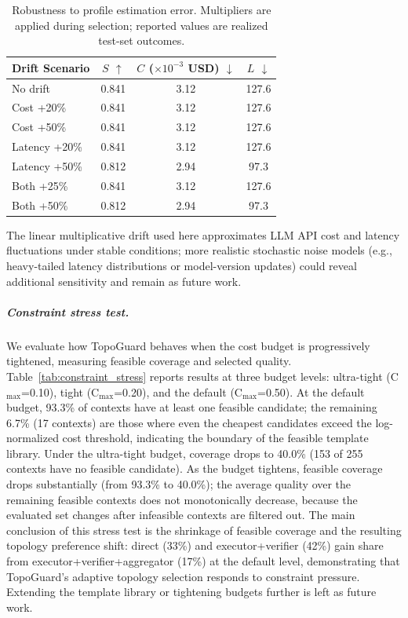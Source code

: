 \documentclass[manuscript,review,anonymous]{acmart}
\begin{document}
\begin{table}[t]
\centering
\caption{Robustness to profile estimation error. Multipliers are applied during selection; reported values are realized test-set outcomes.}
\label{tab:drift_results}
\small
\begin{tabular}{lccc}
\toprule
\textbf{Drift Scenario} & \textbf{$S$ $\uparrow$} & \textbf{$C$ ($\times 10^{-3}$ USD) $\downarrow$} & \textbf{$L$ $\downarrow$} \\
\midrule
No drift         & 0.841 & 3.12 & 127.6 \\
Cost +20\%       & 0.841 & 3.12 & 127.6 \\
Cost +50\%       & 0.841 & 3.12 & 127.6 \\
Latency +20\%    & 0.841 & 3.12 & 127.6 \\
Latency +50\%    & 0.812 & 2.94 & 97.3  \\
Both +25\%       & 0.841 & 3.12 & 127.6 \\
Both +50\%       & 0.812 & 2.94 & 97.3  \\
\bottomrule
\end{tabular}
\end{table}

The linear multiplicative drift used here approximates LLM API cost and latency fluctuations under stable conditions; more realistic stochastic noise models (e.g., heavy-tailed latency distributions or model-version updates) could reveal additional sensitivity and remain as future work.

\subparagraph{Constraint stress test.}
We evaluate how TopoGuard behaves when the cost budget is progressively tightened, measuring feasible coverage and selected quality. Table~\ref{tab:constraint_stress} reports results at three budget levels: ultra-tight (C$_{\max}$=0.10), tight (C$_{\max}$=0.20), and the default (C$_{\max}$=0.50). At the default budget, 93.3\% of contexts have at least one feasible candidate; the remaining 6.7\% (17 contexts) are those where even the cheapest candidates exceed the log-normalized cost threshold, indicating the boundary of the feasible template library. Under the ultra-tight budget, coverage drops to 40.0\% (153 of 255 contexts have no feasible candidate). As the budget tightens, feasible coverage drops substantially (from 93.3\% to 40.0\%); the average quality over the remaining feasible contexts does not monotonically decrease, because the evaluated set changes after infeasible contexts are filtered out. The main conclusion of this stress test is the shrinkage of feasible coverage and the resulting topology preference shift: direct (33\%) and executor+verifier (42\%) gain share from executor+verifier+aggregator (17\%) at the default level, demonstrating that TopoGuard's adaptive topology selection responds to constraint pressure. Extending the template library or tightening budgets further is left as future work.
\end{document}
